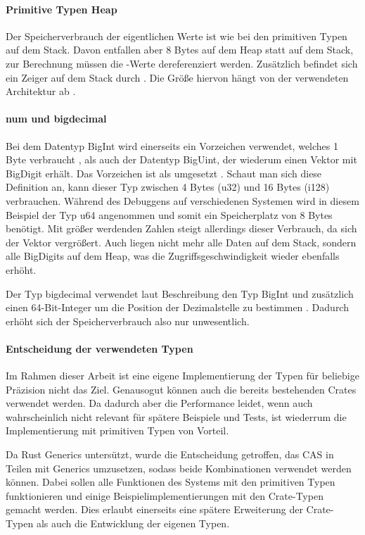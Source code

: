 \documentclass[11pt,a4paper, ngerman]{article}
\begin{document}
\paragraph{Primitive Typen Heap} Der Speicherverbrauch der eigentlichen Werte ist wie bei den primitiven Typen auf dem Stack. Davon entfallen aber 8 Bytes auf dem Heap statt auf dem Stack, zur Berechnung müssen die -Werte dereferenziert werden. Zusätzlich befindet sich ein Zeiger auf dem Stack durch . Die Größe hiervon hängt von der verwendeten Architektur ab \cite{BoxExmaple}.

\paragraph{num und bigdecimal} Bei dem Datentyp BigInt wird einerseits ein Vorzeichen verwendet, welches 1 Byte verbraucht \cite{EnumSize}, als auch der Datentyp BigUint, der wiederum einen Vektor mit BigDigit erhält. Das Vorzeichen ist als  umgesetzt \cite{BigIntSign}. Schaut man sich diese Definition an, kann dieser Typ zwischen 4 Bytes (u32) und 16 Bytes (i128) verbrauchen. Während des Debuggens auf verschiedenen Systemen wird in diesem Beispiel der Typ u64 angenommen und somit ein Speicherplatz von 8 Bytes benötigt. Mit größer werdenden Zahlen steigt allerdings dieser Verbrauch, da sich der Vektor vergrößert. Auch liegen nicht mehr alle Daten auf dem Stack, sondern alle BigDigits auf dem Heap, was die Zugriffsgeschwindigkeit wieder ebenfalls erhöht.

Der Typ bigdecimal verwendet laut Beschreibung den Typ BigInt und zusätzlich einen 64-Bit-Integer um die Position der Dezimalstelle zu bestimmen \cite{CrateBigdecimalDocs}. Dadurch erhöht sich der Speicherverbrauch also nur unwesentlich.

\paragraph{Entscheidung der verwendeten Typen} Im Rahmen dieser Arbeit ist eine eigene Implementierung der Typen für beliebige Präzision nicht das Ziel. Genausogut können auch die bereits bestehenden Crates verwendet werden. Da dadurch aber die Performance leidet, wenn auch wahrscheinlich nicht relevant für spätere Beispiele und Tests, ist wiederrum die Implementierung mit primitiven Typen von Vorteil.

Da Rust Generics untersützt, wurde die Entscheidung getroffen, das CAS in Teilen mit Generics umzusetzen, sodass beide Kombinationen verwendet werden können. Dabei sollen alle Funktionen des Systems mit den primitiven Typen funktionieren und einige Beispielimplementierungen mit den Crate-Typen gemacht werden. Dies erlaubt einerseits eine spätere Erweiterung der Crate-Typen als auch die Entwicklung der eigenen Typen.
\end{document}
